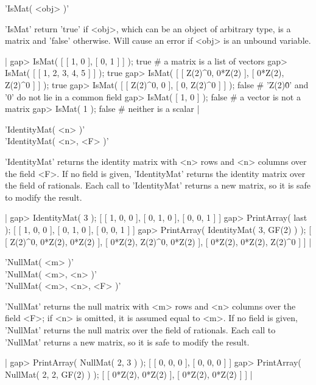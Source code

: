 'IsMat( <obj> )'

'IsMat' return 'true' if <obj>, which can be an object of arbitrary type,
is  a matrix and 'false'  otherwise.  Will cause an error  if <obj> is an
unbound variable.

|    gap> IsMat( [ [ 1, 0 ], [ 0, 1 ] ] );
    true    # a matrix is a list of vectors
    gap> IsMat( [ [ 1, 2, 3, 4, 5 ] ] );
    true
    gap> IsMat( [ [ Z(2)^0, 0*Z(2) ], [ 0*Z(2), Z(2)^0 ] ] );
    true
    gap> IsMat( [ [ Z(2)^0, 0 ], [ 0, Z(2)^0 ] ] );
    false    # 'Z(2)\^0' and '0' do not lie in a common field
    gap> IsMat( [ 1, 0 ] );
    false    # a vector is not a matrix
    gap> IsMat( 1 );
    false    # neither is a scalar |


'IdentityMat( <n> )' \\
'IdentityMat( <n>, <F> )'

'IdentityMat' returns the identity matrix  with <n> rows  and <n> columns
over  the  field  <F>.  If  no field is given, 'IdentityMat'  returns the
identity matrix over the field of rationals.  Each call to 'IdentityMat'
returns a new matrix, so it is safe to modify the result.

|    gap> IdentityMat( 3 );
    [ [ 1, 0, 0 ], [ 0, 1, 0 ], [ 0, 0, 1 ] ]
    gap> PrintArray( last );
    [ [  1,  0,  0 ],
      [  0,  1,  0 ],
      [  0,  0,  1 ] ]
    gap> PrintArray( IdentityMat( 3, GF(2) ) );
    [ [  Z(2)^0,  0*Z(2),  0*Z(2) ],
      [  0*Z(2),  Z(2)^0,  0*Z(2) ],
      [  0*Z(2),  0*Z(2),  Z(2)^0 ] ] |


'NullMat( <m> )' \\
'NullMat( <m>, <n> )' \\
'NullMat( <m>, <n>, <F> )'

'NullMat'  returns the null matrix  with <m> rows and  <n> columns over the
field  <F>; if <n> is omitted,  it is assumed equal to  <m>. If no field is
given,  'NullMat' returns the null matrix over the field of rationals. Each
call to 'NullMat' returns a new matrix, so it is safe to modify the result.

|    gap> PrintArray( NullMat( 2, 3 ) );
    [ [  0,  0,  0 ],
      [  0,  0,  0 ] ]
    gap> PrintArray( NullMat( 2, 2, GF(2) ) );
    [ [  0*Z(2),  0*Z(2) ],
      [  0*Z(2),  0*Z(2) ] ] |

